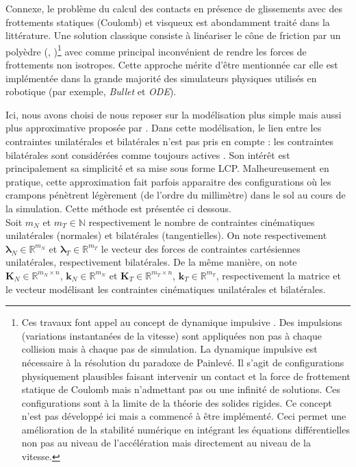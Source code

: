 Connexe, le problème du calcul des contacts en présence de glissements 
avec des frottements statiques (Coulomb) et visqueux est abondamment traité dans la littérature.
Une solution classique consiste à linéariser le cône de friction par un
polyèdre (\cite{stewart_implicit_1996}, \cite{anitescu_formulating_1997})\footnote{
    Ces travaux font appel au concept de \og dynamique impulsive \fg.
    Des impulsions (variations instantanées de la vitesse) sont appliquées non
    pas à chaque collision mais à chaque pas de simulation.
    La dynamique impulsive est nécessaire à la résolution 
    du paradoxe de Painlevé.
    Il s'agit de configurations physiquement plausibles faisant intervenir
    un contact et la force de frottement statique de Coulomb mais
    n'admettant pas ou une infinité de solutions.
    Ces configurations sont à la limite de la théorie des solides rigides.
    Ce concept n'est pas développé ici mais a commencé à être implémenté. 
    Ceci permet une amélioration de la stabilité
    numérique en intégrant les équations différentielles non pas au niveau
    de l'accélération mais directement au niveau de la vitesse.
} avec comme principal inconvénient de rendre les forces de frottements non isotropes.
Cette approche mérite d'être mentionnée car elle est implémentée dans la grande 
majorité des simulateurs physiques utilisés en robotique 
(par exemple, \textit{Bullet} et \textit{ODE}).

Ici, nous avons choisi de nous reposer sur la modélisation
plus simple mais aussi plus approximative proposée par \cite{drumwright_robust_2009}.
Dans cette modélisation, le lien entre les contraintes unilatérales
et bilatérales n'est pas pris en compte : les contraintes bilatérales
sont considérées comme toujours \og actives \fg.
Son intérêt est principalement sa simplicité et sa mise sous forme LCP.
Malheureusement en pratique, cette approximation fait parfois apparaitre 
des configurations où les crampons pénètrent légèrement 
(de l'ordre du millimètre) dans le sol au cours de la simulation.
Cette méthode est présentée ci dessous.\\

Soit $m_{N}$ et $m_{T} \in \mathbb{N}$ respectivement le nombre
de contraintes cinématiques unilatérales (normales) et bilatérales (tangentielles).
On note respectivement $\bm{\lambda}_{N} \in \mathbb{R}^{m_{N}}$ et
$\bm{\lambda}_{T} \in \mathbb{R}^{m_{T}}$ le vecteur
des forces de contraintes cartésiennes unilatérales, respectivement bilatérales.
De la même manière, on note
$\bm{K}_{N} \in \mathbb{R}^{m_{N} \times n}$, 
$\bm{k}_{N} \in \mathbb{R}^{m_{N}}$ et
$\bm{K}_{T} \in \mathbb{R}^{m_{T} \times n}$, 
$\bm{k}_{T} \in \mathbb{R}^{m_{T}}$, respectivement
la matrice et le vecteur modélisant les contraintes cinématiques 
unilatérales et bilatérales.

